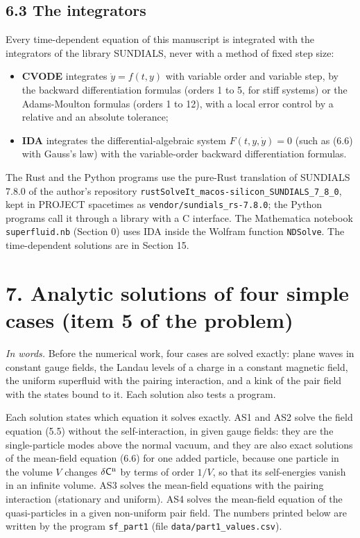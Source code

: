 \documentclass[
  10pt,
]{article}
\providecommand{\tightlist}{%
  \setlength{\itemsep}{0pt}\setlength{\parskip}{0pt}}
\begin{document}
\hypertarget{the-integrators}{%
\subsection{6.3 The integrators}\label{the-integrators}}

Every time-dependent equation of this manuscript is integrated with the
integrators of the library SUNDIALS, never with a method of fixed step
size:

\begin{itemize}
\tightlist
\item
  \textbf{CVODE} integrates \(\dot y=f(t,y)\) with variable order and
  variable step, by the backward differentiation formulas (orders 1 to
  5, for stiff systems) or the Adams-Moulton formulas (orders 1 to 12),
  with a local error control by a relative and an absolute tolerance;
\item
  \textbf{IDA} integrates the differential-algebraic system
  \(F(t,y,\dot y)=0\) (such as (6.6) with Gauss's law) with the
  variable-order backward differentiation formulas.
\end{itemize}

The Rust and the Python programs use the pure-Rust translation of
SUNDIALS 7.8.0 of the author's repository
\texttt{rustSolveIt\_macos-silicon\_SUNDIALS\_7\_8\_0}, kept in PROJECT
spacetimes as \texttt{vendor/sundials\_rs-7.8.0}; the Python programs
call it through a library with a C interface. The Mathematica notebook
\texttt{superfluid.nb} (Section 0) uses IDA inside the Wolfram function
\texttt{NDSolve}. The time-dependent solutions are in Section 15.

\hypertarget{analytic-solutions-of-four-simple-cases-item-5-of-the-problem}{%
\section{7. Analytic solutions of four simple cases (item 5 of the
problem)}\label{analytic-solutions-of-four-simple-cases-item-5-of-the-problem}}

\emph{In words.} Before the numerical work, four cases are solved
exactly: plane waves in constant gauge fields, the Landau levels of a
charge in a constant magnetic field, the uniform superfluid with the
pairing interaction, and a kink of the pair field with the states bound
to it. Each solution also tests a program.

Each solution states which equation it solves exactly. AS1 and AS2 solve
the field equation (5.5) without the self-interaction, in given gauge
fields: they are the single-particle modes above the normal vacuum, and
they are also exact solutions of the mean-field equation (6.6) for one
added particle, because one particle in the volume \(V\) changes
\(\delta\mathsf C^{\rm n}\) by terms of order \(1/V\), so that its
self-energies vanish in an infinite volume. AS3 solves the mean-field
equations with the pairing interaction (stationary and uniform). AS4
solves the mean-field equation of the quasi-particles in a given
non-uniform pair field. The numbers printed below are written by the
program \texttt{sf\_part1} (file \texttt{data/part1\_values.csv}).
\end{document}
